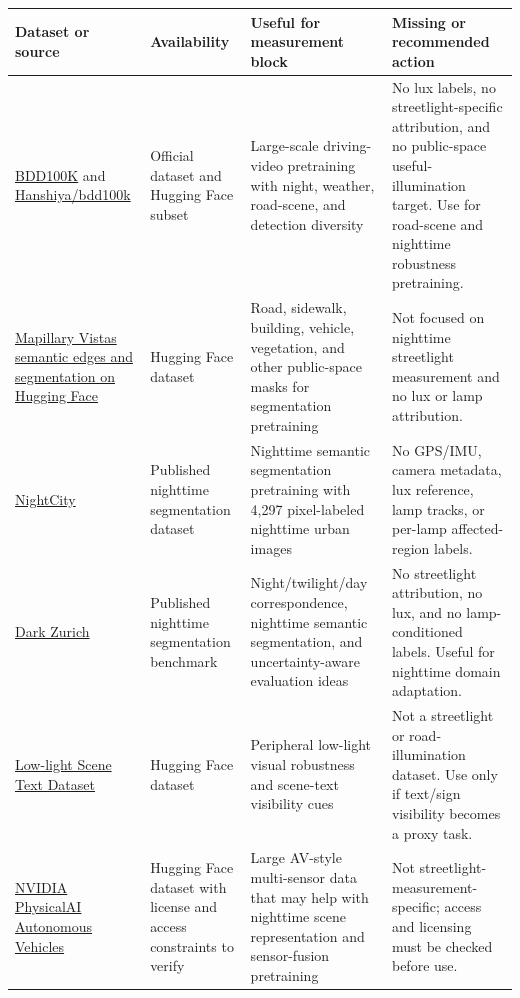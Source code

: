 \documentclass[11pt]{article}
\begin{document}
\begin{center}
\begin{tabularx}{\textwidth}{>{\raggedright\arraybackslash}p{}>{\raggedright\arraybackslash}p{}>{\raggedright\arraybackslash}X>{\raggedright\arraybackslash}p{}}
\toprule
Dataset or source & Availability & Useful for measurement block & Missing or recommended action \\
\midrule
\href{https://bdd-data.berkeley.edu/}{BDD100K} and \href{https://huggingface.co/datasets/Hanshiya/bdd100k}{Hanshiya/bdd100k} & Official dataset and Hugging Face subset & Large-scale driving-video pretraining with night, weather, road-scene, and detection diversity & No lux labels, no streetlight-specific attribution, and no public-space useful-illumination target. Use for road-scene and nighttime robustness pretraining. \\
\href{https://huggingface.co/datasets/moritzef/mapillary_vistas_semantic_edges_and_segmentation}{Mapillary Vistas semantic edges and segmentation on Hugging Face} & Hugging Face dataset & Road, sidewalk, building, vehicle, vegetation, and other public-space masks for segmentation pretraining & Not focused on nighttime streetlight measurement and no lux or lamp attribution. \\
\href{https://arxiv.org/abs/2003.06883}{NightCity} & Published nighttime segmentation dataset & Nighttime semantic segmentation pretraining with 4,297 pixel-labeled nighttime urban images & No GPS/IMU, camera metadata, lux reference, lamp tracks, or per-lamp affected-region labels. \\
\href{https://arxiv.org/abs/2005.14553}{Dark Zurich} & Published nighttime segmentation benchmark & Night/twilight/day correspondence, nighttime semantic segmentation, and uncertainty-aware evaluation ideas & No streetlight attribution, no lux, and no lamp-conditioned labels. Useful for nighttime domain adaptation. \\
\href{https://huggingface.co/datasets/lumimusta/Low-light_Scene_Text_Dataset}{Low-light Scene Text Dataset} & Hugging Face dataset & Peripheral low-light visual robustness and scene-text visibility cues & Not a streetlight or road-illumination dataset. Use only if text/sign visibility becomes a proxy task. \\
\href{https://huggingface.co/datasets/nvidia/PhysicalAI-Autonomous-Vehicles}{NVIDIA PhysicalAI Autonomous Vehicles} & Hugging Face dataset with license and access constraints to verify & Large AV-style multi-sensor data that may help with nighttime scene representation and sensor-fusion pretraining & Not streetlight-measurement-specific; access and licensing must be checked before use. \\
\bottomrule
\end{tabularx}
\end{center}
\end{document}
